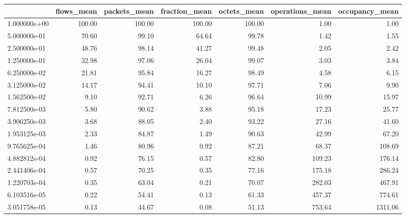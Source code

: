 \begin{tabular}{lrrrrrr}
\toprule
{} &  flows\_mean &  packets\_mean &  fraction\_mean &  octets\_mean &  operations\_mean &  occupancy\_mean \\
\midrule
1.000000e+00 &      100.00 &        100.00 &         100.00 &       100.00 &             1.00 &            1.00 \\
5.000000e-01 &       70.60 &         99.10 &          64.64 &        99.78 &             1.42 &            1.55 \\
2.500000e-01 &       48.76 &         98.14 &          41.27 &        99.48 &             2.05 &            2.42 \\
1.250000e-01 &       32.98 &         97.06 &          26.04 &        99.07 &             3.03 &            3.84 \\
6.250000e-02 &       21.81 &         95.84 &          16.27 &        98.49 &             4.58 &            6.15 \\
3.125000e-02 &       14.17 &         94.41 &          10.10 &        97.71 &             7.06 &            9.90 \\
1.562500e-02 &        9.10 &         92.71 &           6.26 &        96.64 &            10.99 &           15.97 \\
7.812500e-03 &        5.80 &         90.62 &           3.88 &        95.18 &            17.23 &           25.77 \\
3.906250e-03 &        3.68 &         88.05 &           2.40 &        93.22 &            27.16 &           41.60 \\
1.953125e-03 &        2.33 &         84.87 &           1.49 &        90.63 &            42.99 &           67.20 \\
9.765625e-04 &        1.46 &         80.96 &           0.92 &        87.21 &            68.37 &          108.69 \\
4.882812e-04 &        0.92 &         76.15 &           0.57 &        82.80 &           109.23 &          176.14 \\
2.441406e-04 &        0.57 &         70.25 &           0.35 &        77.16 &           175.18 &          286.24 \\
1.220703e-04 &        0.35 &         63.04 &           0.21 &        70.07 &           282.03 &          467.91 \\
6.103516e-05 &        0.22 &         54.41 &           0.13 &        61.33 &           457.37 &          774.61 \\
3.051758e-05 &        0.13 &         44.67 &           0.08 &        51.13 &           753.64 &         1311.06 \\

\end{tabular}
